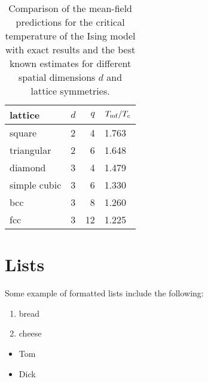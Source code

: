 \documentclass[12pt]{article}
\begin{document}
							      \begin{table}[h]
							      \begin{center}
							      \begin{tabular}{|l|l|r|l|}
							      \hline
							      lattice & $d$ & $q$ & $T_{\rm mf}/T_c$ \\
								      \hline
								      square & 2 & 4 & 1.763 \\
									      \hline
									      triangular & 2 & 6 & 1.648 \\
										      \hline
										      diamond & 3 & 4 & 1.479 \\
											      \hline
											      simple cubic & 3 & 6 & 1.330 \\
												      \hline
												      bcc & 3 & 8 & 1.260 \\
													      \hline
													      fcc & 3 & 12 & 1.225 \\
														      \hline
														      \end{tabular}
														      \caption{\label{tab:5/tc}Comparison of the mean-field predictions
															      for the critical temperature of the Ising model with exact results
																      and the best known estimates for different spatial dimensions $d$
																	      and lattice symmetries.}
																	      \end{center}
																	      \end{table}

																	      \section{Lists}

																	      Some example of formatted lists include the
																	      following:

																	      \begin{enumerate}

																	      \item bread

																	      \item cheese

																	      \end{enumerate}

																	      \begin{itemize}

																	      \item Tom

																	      \item Dick

																	      \end{itemize}
\end{document}
